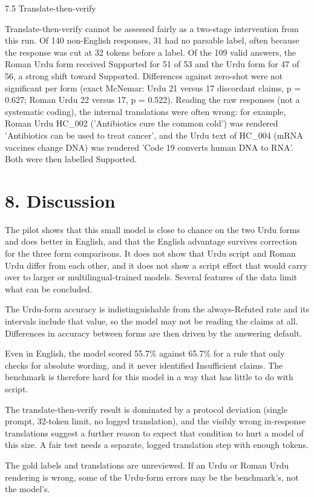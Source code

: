 \documentclass[10pt,a4paper]{article}
\begin{document}
7.5 Translate-then-verify

Translate-then-verify cannot be assessed fairly as a two-stage intervention from this run. Of 140 non-English responses, 31 had no parsable label, often because the response was cut at 32 tokens before a label. Of the 109 valid answers, the Roman Urdu form received Supported for 51 of 53 and the Urdu form for 47 of 56, a strong shift toward Supported. Differences against zero-shot were not significant per form (exact McNemar: Urdu 21 versus 17 discordant claims, p = 0.627; Roman Urdu 22 versus 17, p = 0.522). Reading the raw responses (not a systematic coding), the internal translations were often wrong: for example, Roman Urdu HC\_002 ('Antibiotics cure the common cold') was rendered 'Antibiotics can be used to treat cancer', and the Urdu text of HC\_004 (mRNA vaccines change DNA) was rendered 'Code 19 converts human DNA to RNA'. Both were then labelled Supported.

\section{8. Discussion}
The pilot shows that this small model is close to chance on the two Urdu forms and does better in English, and that the English advantage survives correction for the three form comparisons. It does not show that Urdu script and Roman Urdu differ from each other, and it does not show a script effect that would carry over to larger or multilingual-trained models. Several features of the data limit what can be concluded.

The Urdu-form accuracy is indistinguishable from the always-Refuted rate and its intervals include that value, so the model may not be reading the claims at all. Differences in accuracy between forms are then driven by the answering default.

Even in English, the model scored 55.7\% against 65.7\% for a rule that only checks for absolute wording, and it never identified Insufficient claims. The benchmark is therefore hard for this model in a way that has little to do with script.

The translate-then-verify result is dominated by a protocol deviation (single prompt, 32-token limit, no logged translation), and the visibly wrong in-response translations suggest a further reason to expect that condition to hurt a model of this size. A fair test needs a separate, logged translation step with enough tokens.

The gold labels and translations are unreviewed. If an Urdu or Roman Urdu rendering is wrong, some of the Urdu-form errors may be the benchmark's, not the model's.
\end{document}
